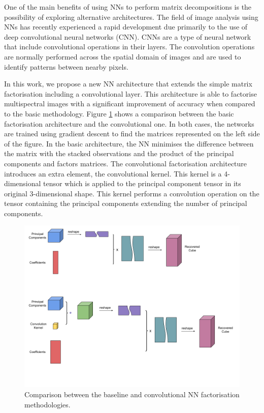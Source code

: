 \documentclass[essd, manuscript]{copernicus}
\begin{document}
One of the main benefits of using NNs to perform matrix decompositions is the possibility of exploring alternative architectures. The field of image analysis using NNs has recently experienced a rapid development due primarily to the use of deep convolutional neural networks (CNN). CNNs are a type of neural network that include convolutional operations in their layers. The convolution operations are normally performed across the spatial domain of images and are used to identify patterns between nearby pixels.

In this work, we propose a new NN architecture that extends the simple matrix factorisation including a convolutional layer. This architecture is able to factorise multispectral images with a significant improvement of accuracy when compared to the basic methodology. Figure \ref{factorisation_methods} shows a comparison between the basic factorisation architecture and the convolutional one. In both cases, the networks are trained using gradient descent to find the matrices represented on the left side of the figure. In the basic architecture, the NN minimises the difference between the matrix with the stacked observations and the product of the principal components and factors matrices. The convolutional factorisation architecture introduces an extra element, the convolutional kernel. This kernel is a 4-dimensional tensor which is applied to the principal component tensor in its original 3-dimensional shape. This kernel performs a convolution operation on the tensor containing the principal components extending the number of principal components. 

\begin{figure}%
    \includegraphics[width=14cm]{fig6.png}
    \caption{Comparison between the baseline and convolutional NN factorisation methodologies.}%
    \label{factorisation_methods}%
\end{figure}
\end{document}
